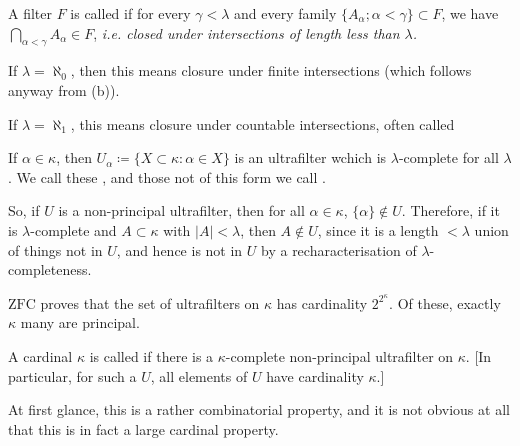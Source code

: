 \documentclass[]{article}
\newcommand{\zfc}{\textrm{ZFC}}
\begin{document}
A filter $F$ is called  if for every $\gamma < \lambda$ and every family $\{A_\alpha ;\alpha < \gamma\}\subset F$, we have $\bigcap_{\alpha < \gamma} A_\alpha \in F$, \it{i.e.} closed under intersections of length less than $\lambda$.

\begin{remark*}
    If $\lambda = \aleph_0$, then this means closure under finite intersections (which follows anyway from (b)).

    If $\lambda = \aleph_1$, this means closure under countable intersections, often called 
\end{remark*}

If $\alpha \in \kappa$, then $U_\alpha \coloneqq \{X\subset \kappa : \alpha \in X\}$ is an ultrafilter wchich is $\lambda$-complete for all $\lambda$. We call these , and those not of this form we call .

So, if $U$ is a non-principal ultrafilter, then for all $\alpha \in \kappa$, $\{\alpha\}\not\in U$. Therefore, if it is $\lambda$-complete and $A\subset \kappa$ with $|A| < \lambda$, then $A \not\in U$, since it is a length $< \lambda$ union of things not in $U$, and hence is not in $U$ by a recharacterisation of $\lambda$-completeness.

\begin{remark*}[Fact]
    $\zfc$ proves that the set of ultrafilters on $\kappa$ has cardinality $2^{2^\kappa}$. Of these, exactly $\kappa$ many are principal.
\end{remark*}

\begin{defin*}
    A cardinal $\kappa$ is called  if there is a $\kappa$-complete non-principal ultrafilter on $\kappa$. [In particular, for such a $U$, all elements of $U$ have cardinality $\kappa$.]
\end{defin*}

At first glance, this is a rather combinatorial property, and it is not obvious at all that this is in fact a large cardinal property.
\end{document}
